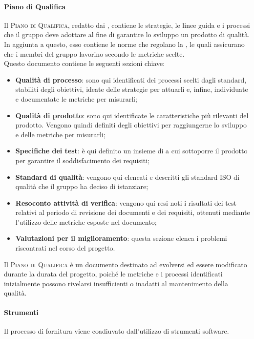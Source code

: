 \documentclass[../norme-di-progetto.tex]{subfiles}
\begin{document}
\paragraph{Piano di Qualifica}
Il \textsc{Piano di Qualifica}, redatto dai , contiene le strategie, le linee guida e i processi che il gruppo deve adottare al fine di garantire lo sviluppo un prodotto di qualità. In aggiunta a questo, esso contiene le norme che regolano la , le quali assicurano che i membri del gruppo lavorino secondo le metriche scelte. \\
Questo documento contiene le seguenti sezioni chiave:
\begin{itemize}
  \item \textbf{Qualità di processo}: sono qui identificati dei processi scelti dagli standard, stabiliti degli obiettivi, ideate delle strategie per attuarli e, infine, individuate e documentate le metriche per misurarli;
  \item \textbf{Qualità di prodotto}: sono qui identificate le caratteristiche più rilevanti del prodotto. Vengono quindi definiti degli obiettivi per raggiungerne lo sviluppo e delle metriche per misurarli;
  \item \textbf{Specifiche dei test}: è qui definito un insieme di  a cui sottoporre il prodotto per garantire il soddisfacimento dei requisiti;
  \item \textbf{Standard di qualità}: vengono qui elencati e descritti gli standard ISO di qualità che il gruppo ha deciso di istanziare;
  \item \textbf{Resoconto attività di verifica}: vengono qui resi noti i risultati dei test relativi al periodo di revisione dei documenti e dei requisiti, ottenuti mediante l'utilizzo delle metriche esposte nel documento;
  \item \textbf{Valutazioni per il miglioramento}: questa sezione elenca i problemi riscontrati nel corso del progetto.
\end{itemize}

Il \textsc{Piano di Qualifica} è un documento destinato ad evolversi ed essere modificato durante la durata del progetto, poiché le metriche e i processi identificati inizialmente possono rivelarsi insufficienti o inadatti al mantenimento della qualità.
\paragraph{Strumenti}
Il processo di fornitura viene coadiuvato dall'utilizzo di strumenti software.
\end{document}
